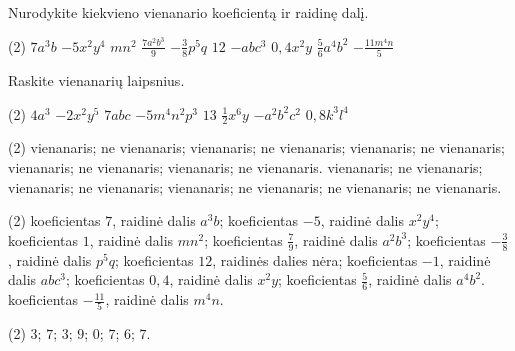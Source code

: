 \documentclass[11pt,a4paper]{scrartcl}
\begin{document}
\begin{problem}
Nurodykite kiekvieno vienanario koeficientą ir raidinę dalį.

\begin{tasks}[label={(\arabic*)}, label-offset=0.9em](2)
    \task $7a^3b$
    \task $-5x^2y^4$
    \task $mn^2$
    \task $\frac{7a^2b^3}{9}$
    \task $-\frac{3}{8}p^5q$
    \task $12$
    \task $-abc^3$
    \task $0,4x^2y$
    \task $\frac{5}{6}a^4b^2$
    \task $-\frac{11m^4n}{5}$
\end{tasks}
\end{problem}

\begin{problem}
Raskite vienanarių laipsnius.

\begin{tasks}[label={(\arabic*)}, label-offset=0.9em](2)
    \task $4a^3$
    \task $-2x^2y^5$
    \task $7abc$
    \task $-5m^4n^2p^3$
    \task $13$
    \task $\frac{1}{2}x^6y$
    \task $-a^2b^2c^2$
    \task $0,8k^3l^4$
\end{tasks}
\end{problem}

\newpage
\answerssection

\begin{problem} \phantom{text}
\begin{tasks}[label={(\arabic*)}, label-offset=0.9em](2)
    \task vienanaris;
    \task ne vienanaris;
    \task vienanaris;
    \task ne vienanaris;
    \task vienanaris;
    \task ne vienanaris;
    \task vienanaris;
    \task ne vienanaris;
    \task vienanaris;
    \task ne vienanaris.
    \task vienanaris;
    \task ne vienanaris;
    \task vienanaris;
    \task ne vienanaris;
    \task vienanaris;
    \task ne vienanaris;
    \task ne vienanaris;
    \task ne vienanaris.
\end{tasks}
\end{problem}

\begin{problem} \phantom{text}
    \begin{tasks}[label={(\arabic*)}, label-offset=0.9em](2)
    \task koeficientas $7$, raidinė dalis $a^3b$;
    \task koeficientas $-5$, raidinė dalis $x^2y^4$;
    \task koeficientas $1$, raidinė dalis $mn^2$;
    \task koeficientas $\frac{7}{9}$, raidinė dalis $a^2b^3$;
    \task koeficientas $-\frac{3}{8}$, raidinė dalis $p^5q$;
    \task koeficientas $12$, raidinės dalies nėra;
    \task koeficientas $-1$, raidinė dalis $abc^3$;
    \task koeficientas $0,4$, raidinė dalis $x^2y$;
    \task koeficientas $\frac{5}{6}$, raidinė dalis $a^4b^2$.
    \task koeficientas $-\frac{11}{5}$, raidinė dalis $m^4n$.
\end{tasks}
\end{problem}

\begin{problem} \phantom{text}
\begin{tasks}[label={(\arabic*)}, label-offset=0.9em](2)
    \task $3$;
    \task $7$;
    \task $3$;
    \task $9$;
    \task $0$;
    \task $7$;
    \task $6$;
    \task $7$.
\end{tasks}
\end{problem}
\end{document}
